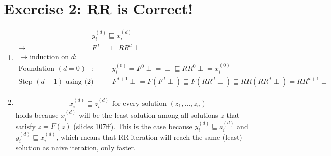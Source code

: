 \documentclass[11pt,a4paper]{scrartcl}
\begin{document}
\section*{Exercise 2: RR is Correct!}
\begin{enumerate}
\item \begin{align}
&y_i^{(d)} \sqsubseteq x_i^{(d)}\\
\rightarrow &F^d \perp \sqsubseteq RR^d \perp\\
\rightarrow \text{induction on $d$:}\\
\text{Foundation $(d = 0)$}&: \hspace{1cm} y_i^{(0)} = F^0 \perp = \perp \sqsubseteq  RR^0 \perp = x_i^{(0)}\\
\text{Step $(d+1)$ using (2)}&: \hspace{1cm} F^{d+1} \perp = F(F^d \perp) \sqsubseteq F(RR^d \perp) \sqsubseteq  RR(RR^d \perp) = RR^{d+1} \perp
\end{align}
\item \begin{align*}
x_i^{(d)} \sqsubseteq z_i^{(d)} \text{ for every solution } (z_1,...,z_n)
\end{align*}
holds because $x_i^{(d)}$ will be the least solution among all solutions $z$ that satisfy $z = F(z)$ (slides 107ff). This is the case because $y_i^{(d)} \sqsubseteq z_i^{(d)}$ and $y_i^{(d)} \sqsubseteq x_i^{(d)}$, which means that RR iteration will reach the same (least) solution as naive iteration, only faster.
\end{enumerate}
\end{document}
